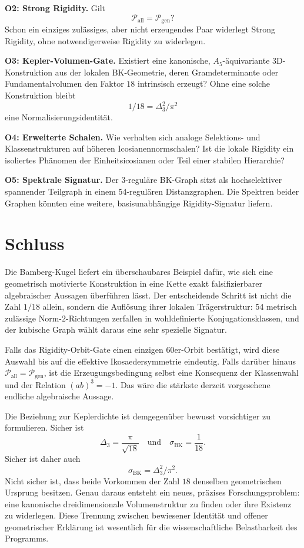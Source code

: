 \documentclass[11pt,a4paper]{article}
\theoremstyle{definition}
\newcommand{\Pgen}{\mathcal P_{\mathrm{gen}}}
\newcommand{\Pall}{\mathcal P_{\mathrm{all}}}
\newcommand{\BK}{\mathrm{BK}}
\begin{document}
\textbf{O2: Strong Rigidity.}
Gilt
\[
\Pall=\Pgen?
\]
Schon ein einziges zulässiges, aber nicht erzeugendes Paar widerlegt Strong Rigidity, ohne notwendigerweise Rigidity zu widerlegen.

\textbf{O3: Kepler-Volumen-Gate.}
Existiert eine kanonische, \(A_5\)-äquivariante 3D-Konstruktion aus der lokalen BK-Geometrie, deren Gramdeterminante oder Fundamentalvolumen den Faktor \(18\) intrinsisch erzeugt? Ohne eine solche Konstruktion bleibt
\[
1/18=\Delta_3^2/\pi^2
\]
eine Normalisierungsidentität.

\textbf{O4: Erweiterte Schalen.}
Wie verhalten sich analoge Selektions- und Klassenstrukturen auf höheren Icosianennormschalen? Ist die lokale Rigidity ein isoliertes Phänomen der Einheitsicosianen oder Teil einer stabilen Hierarchie?

\textbf{O5: Spektrale Signatur.}
Der 3-reguläre BK-Graph sitzt als hochselektiver spannender Teilgraph in einem 54-regulären Distanzgraphen. Die Spektren beider Graphen könnten eine weitere, basisunabhängige Rigidity-Signatur liefern.

\section{Schluss}

Die Bamberg-Kugel liefert ein überschaubares Beispiel dafür, wie sich eine geometrisch motivierte Konstruktion in eine Kette exakt falsifizierbarer algebraischer Aussagen überführen lässt. Der entscheidende Schritt ist nicht die Zahl \(1/18\) allein, sondern die Auflösung ihrer lokalen Trägerstruktur: 54 metrisch zulässige Norm-\(2\)-Richtungen zerfallen in wohldefinierte Konjugationsklassen, und der kubische Graph wählt daraus eine sehr spezielle Signatur.

Falls das Rigidity-Orbit-Gate einen einzigen 60er-Orbit bestätigt, wird diese Auswahl bis auf die effektive Ikosaedersymmetrie eindeutig. Falls darüber hinaus \(\Pall=\Pgen\), ist die Erzeugungsbedingung selbst eine Konsequenz der Klassenwahl und der Relation \((ab)^3=-1\). Das wäre die stärkste derzeit vorgesehene endliche algebraische Aussage.

Die Beziehung zur Keplerdichte ist demgegenüber bewusst vorsichtiger zu formulieren. Sicher ist
\[
\Delta_3=\frac{\pi}{\sqrt{18}}
\quad\text{und}\quad
\sigma_{\BK}=\frac1{18}.
\]
Sicher ist daher auch
\[
\sigma_{\BK}=\Delta_3^2/\pi^2.
\]
Nicht sicher ist, dass beide Vorkommen der Zahl \(18\) denselben geometrischen Ursprung besitzen. Genau daraus entsteht ein neues, präzises Forschungsproblem: eine kanonische dreidimensionale Volumenstruktur zu finden oder ihre Existenz zu widerlegen. Diese Trennung zwischen bewiesener Identität und offener geometrischer Erklärung ist wesentlich für die wissenschaftliche Belastbarkeit des Programms.
\end{document}
